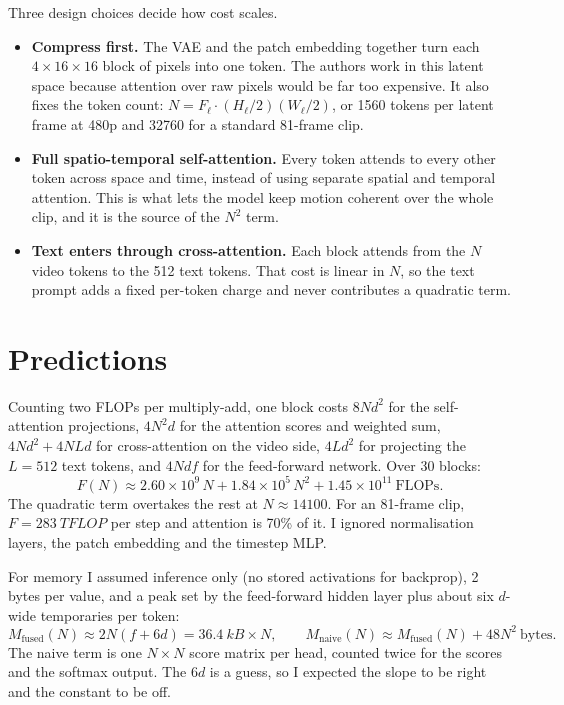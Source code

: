 \documentclass[11pt]{article}
\begin{document}
Three design choices decide how cost scales.
\begin{itemize}
\item \textbf{Compress first.} The VAE and the patch embedding together turn each $4 \times 16 \times 16$ block of pixels into one token. The authors work in this latent space because attention over raw pixels would be far too expensive. It also fixes the token count: $N = F_\ell \cdot (H_\ell/2)(W_\ell/2)$, or \num{1560} tokens per latent frame at 480p and \num{32760} for a standard 81-frame clip.
\item \textbf{Full spatio-temporal self-attention.} Every token attends to every other token across space and time, instead of using separate spatial and temporal attention. This is what lets the model keep motion coherent over the whole clip, and it is the source of the $N^2$ term.
\item \textbf{Text enters through cross-attention.} Each block attends from the $N$ video tokens to the 512 text tokens. That cost is linear in $N$, so the text prompt adds a fixed per-token charge and never contributes a quadratic term.
\end{itemize}

\section{Predictions}

Counting two FLOPs per multiply-add, one block costs $8Nd^2$ for the self-attention projections, $4N^2d$ for the attention scores and weighted sum, $4Nd^2 + 4NLd$ for cross-attention on the video side, $4Ld^2$ for projecting the $L = 512$ text tokens, and $4Ndf$ for the feed-forward network. Over 30 blocks:
\begin{equation}
F(N) \approx 2.60\times10^{9}\,N + 1.84\times10^{5}\,N^{2} + 1.45\times10^{11}\ \text{FLOPs}.
\end{equation}
The quadratic term overtakes the rest at $N \approx \num{14100}$. For an 81-frame clip, $F = \SI{283}{TFLOP}$ per step and attention is 70\% of it. I ignored normalisation layers, the patch embedding and the timestep MLP.

For memory I assumed inference only (no stored activations for backprop), 2 bytes per value, and a peak set by the feed-forward hidden layer plus about six $d$-wide temporaries per token:
\begin{equation}
M_\text{fused}(N) \approx 2N(f + 6d) = \SI{36.4}{kB}\times N, \qquad
M_\text{naive}(N) \approx M_\text{fused}(N) + 48N^{2}\ \text{bytes}.
\end{equation}
The naive term is one $N \times N$ score matrix per head, counted twice for the scores and the softmax output. The $6d$ is a guess, so I expected the slope to be right and the constant to be off.
\end{document}
